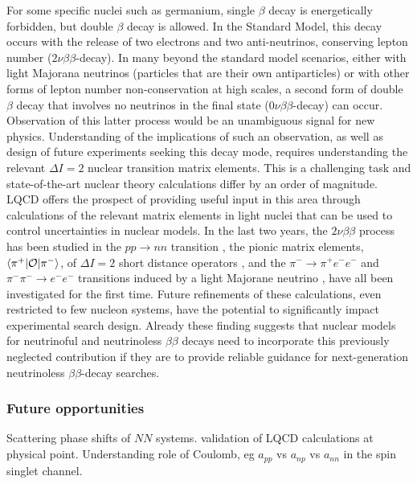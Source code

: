 For some specific nuclei such as germanium, single $\beta$ decay is energetically forbidden, but double $\beta$ decay is allowed. In the Standard Model, this decay occurs with the release of two electrons and two anti-neutrinos, conserving lepton number  ($2\nu\beta\beta$-decay). In many beyond the standard model scenarios, either with light Majorana neutrinos (particles that are their own antiparticles) or with other forms of lepton number non-conservation at high scales,  a second form of  double $\beta$ decay that involves no neutrinos in the final state ($0\nu\beta\beta$-decay) can occur. Observation of this latter process would be an unambiguous signal for new physics. Understanding of the implications of such an observation, as well as design of future experiments seeking this decay mode, requires understanding the relevant $\Delta I=2$ nuclear transition matrix elements. This is a challenging task and state-of-the-art nuclear theory calculations differ by an order of magnitude. LQCD offers the prospect of providing useful input in this area through calculations of the relevant matrix elements in light nuclei that can be used to control uncertainties in nuclear models. In the last two years, the $2\nu\beta\beta$ process has been studied in the $pp\to nn$ transition \cite{Tiburzi:2017iux,Shanahan:2017bgi},  the pionic matrix elements, $\langle \pi^+ | {\cal O} | \pi^- \rangle$, of $\Delta I =2$ short distance operators \cite{Nicholson:2018mwc}, and the $\pi^-\to \pi^+ e^- e^-$ and $\pi^-\pi^-\to e^-e^-$ transitions induced  by a light Majorane neutrino \cite{Feng:2018pdq,Detmold:2018zan}, have all been investigated for the first time. Future refinements of these calculations, even restricted to few nucleon systems, have the potential to significantly impact experimental search design.  Already  these finding suggests that nuclear models for neutrinoful and neutrinoless $\beta\beta$ decays need to incorporate this previously neglected contribution if they are to provide reliable guidance for next-generation neutrinoless $\beta\beta$-decay searches. 



\subsubsection{Future opportunities}



Scattering  phase shifts of $NN$ systems. validation of LQCD calculations at physical point. Understanding role of Coulomb, eg $a_{pp}$ vs $a_{np}$ vs $a_{nn}$ in the spin singlet channel.

